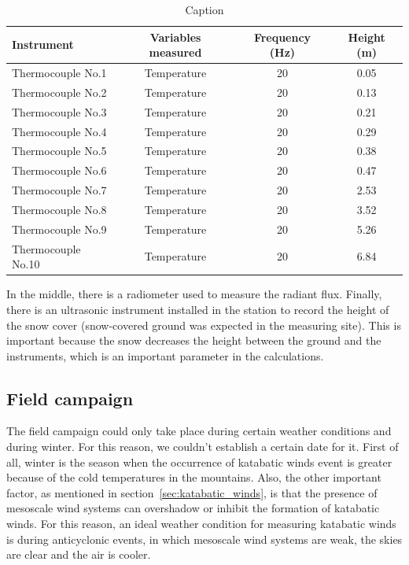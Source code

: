 \begin{table}[!ht]
    \centering
    \begin{tabular}{ | l | c | c | c |}
    \hline
    \textbf{Instrument} & \textbf{Variables measured} & \textbf{Frequency (Hz)} & \textbf{Height (m)} \\ [0.5ex]  \hline\hline
    Thermocouple No.1 & Temperature & 20 &  0.05\\
    \hline
    Thermocouple No.2 & Temperature & 20 &  0.13\\
    \hline
    Thermocouple No.3 & Temperature & 20 &  0.21\\
    \hline
    Thermocouple No.4 & Temperature & 20 &  0.29\\
    \hline
    Thermocouple No.5 & Temperature & 20 &  0.38\\
    \hline
    Thermocouple No.6 & Temperature & 20 &  0.47\\
    \hline
    Thermocouple No.7 & Temperature & 20 &  2.53\\
    \hline
    Thermocouple No.8 & Temperature & 20 &  3.52\\
    \hline
    Thermocouple No.9 & Temperature & 20 &  5.26\\
    \hline
    Thermocouple No.10 & Temperature & 20 & 6.84 \\
    \hline
    
    \end{tabular}
    \caption{Caption}
    \label{tab:intruments_thermocouples}
\end{table}

In the middle, there is a radiometer used to measure the radiant flux. Finally, there is an ultrasonic instrument installed in the station to record the height of the snow cover (snow-covered ground was expected in the measuring site). This is important because the snow decreases the height between the ground and the instruments, which is an important parameter in the calculations.

\subsection{Field campaign}

The field campaign could only take place during certain weather conditions and during winter. For this reason, we couldn't establish a certain date for it. First of all, winter is the season when the occurrence of katabatic winds event is greater because of the cold temperatures in the mountains. Also, the other important factor, as mentioned in section~\ref{sec:katabatic_winds}, is that the presence of mesoscale wind systems can overshadow or inhibit the formation of katabatic winds. For this reason, an ideal weather condition for measuring katabatic winds is during anticyclonic events, in which mesoscale wind systems are weak, the skies are clear and the air is cooler.

